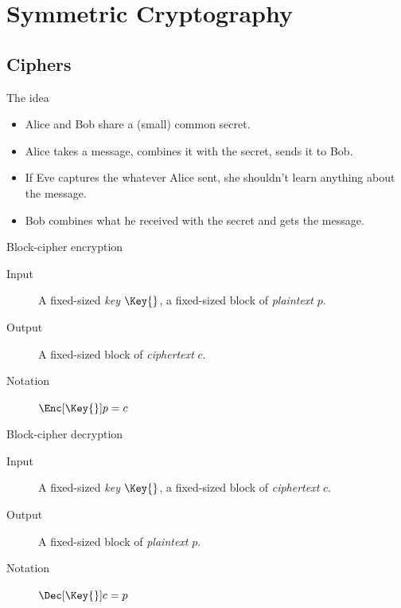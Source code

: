 \section{Symmetric Cryptography}

\subsection{Ciphers}

\begin{frame}
  \begin{block}{The idea}
    \begin{itemize}
      \item Alice and Bob share a (small) common secret.

        \pause{}

      \item Alice takes a message, combines it with the secret, sends it to 
        Bob.

        \pause{}

      \item If Eve captures the whatever Alice sent, she shouldn't learn 
        anything about the message.

        \pause{}

      \item Bob combines what he received with the secret and gets the message.
    \end{itemize}
  \end{block}
\end{frame}

\begin{frame}
  \begin{block}{Block-cipher encryption}
    \begin{description}
      \item[Input] A fixed-sized \emph{key} \(\Key{}\), a fixed-sized block of 
        \emph{plaintext} \(p\).
      \item[Output] A fixed-sized block of \emph{ciphertext} \(c\).
      \item[Notation] \(\Enc[\Key{}]{p} = c\)
    \end{description}
  \end{block}

  \pause{}

  \begin{block}{Block-cipher decryption}
    \begin{description}
      \item[Input] A fixed-sized \emph{key} \(\Key{}\), a fixed-sized block of 
        \emph{ciphertext} \(c\).
      \item[Output] A fixed-sized block of \emph{plaintext} \(p\).
      \item[Notation] \(\Dec[\Key{}]{c} = p\)
    \end{description}
  \end{block}
\end{frame}

